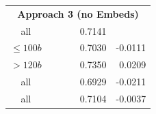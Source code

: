 \documentclass{article}
\newcommand{\xmark}{\ding{55}} %
\newcommand{\cmark}{\ding{51}}
\begin{document}
\begin{table}[!ht]
\begin{tabular}{ccccrr}
\midrule\multicolumn{6}{c}{\textbf{Approach 3 (no Embeds)}} \\
all & \xmark & \xmark & \xmark & 0.7141 & \\
$\le 100b$ & \xmark & \xmark & \xmark & 0.7030 & -0.0111 \\
$>120b$ & \xmark & \xmark & \xmark & 0.7350 & 0.0209 \\
all & \xmark & \cmark & \xmark & 0.6929 & -0.0211 \\
all & \cmark & \xmark & \xmark & 0.7104 & -0.0037 \\
\bottomrule
\end{tabular}
\end{table}
\end{document}
